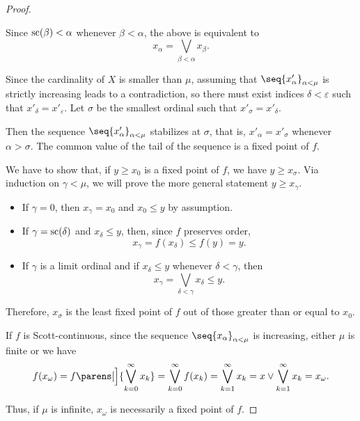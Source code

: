 \begin{proof}
\begin{itemize}
    Since \( \op{sc}(\beta) < \alpha \) whenever \( \beta < \alpha \), the above is equivalent to
    \begin{equation*}
      x_\alpha = \bigvee_{\beta < \alpha} x_\beta.
    \end{equation*}
  \end{itemize}

   Since the cardinality of \( X \) is smaller than \( \mu \), assuming that \( \seq{ x'_\alpha }_{\alpha < \mu} \) is strictly increasing leads to a contradiction, so there must exist indices \( \delta < \varepsilon \) such that \( x'_\delta = x'_\varepsilon \). Let \( \sigma \) be the smallest ordinal such that \( x'_\sigma = x'_\delta \).

  Then the sequence \( \seq{ x'_\alpha }_{\alpha < \mu} \) stabilizes at \( \sigma \), that is, \( x'_\alpha = x'_\sigma \) whenever \( \alpha > \sigma \). The common value of the tail of the sequence is a fixed point of \( f \).

   We have to show that, if \( y \geq x_0 \) is a fixed point of \( f \), we have \( y \geq x_\sigma \). Via induction on \( \gamma < \mu \), we will prove the more general statement \( y \geq x_\gamma \).
  \begin{itemize}
    \item If \( \gamma = 0 \), then \( x_\gamma = x_0 \) and \( x_0 \leq y \) by assumption.
    \item If \( \gamma = \op{sc}(\delta) \) and  \( x_\delta \leq y \), then, since \( f \) preserves order,
    \begin{equation*}
      x_\gamma = f(x_\delta) \leq f(y) = y.
    \end{equation*}

    \item If \( \gamma \) is a limit ordinal and if \( x_\delta \leq y \) whenever \( \delta < \gamma \), then
    \begin{equation*}
      x_\gamma = \bigvee_{\delta < \gamma} x_\delta \leq y.
    \end{equation*}
  \end{itemize}

  Therefore, \( x_\sigma \) is the least fixed point of \( f \) out of those greater than or equal to \( x_0 \).

   If \( f \) is Scott-continuous, since the sequence \( \seq{ x_\alpha }_{\alpha < \mu} \) is increasing, either \( \mu \) is finite or we have
  \begin{equation*}
    f(x_\omega)
    =
    f\parens[\Big]{ \bigvee_{k=0}^\infty x_k }
    =
    \bigvee_{k=0}^\infty f(x_k)
    =
    \bigvee_{k=1}^\infty x_k
    =
    x \vee \bigvee_{k=1}^\infty x_k
    =
    x_\omega.
  \end{equation*}

  Thus, if \( \mu \) is infinite, \( x_\omega \) is necessarily a fixed point of \( f \).
\end{proof}


